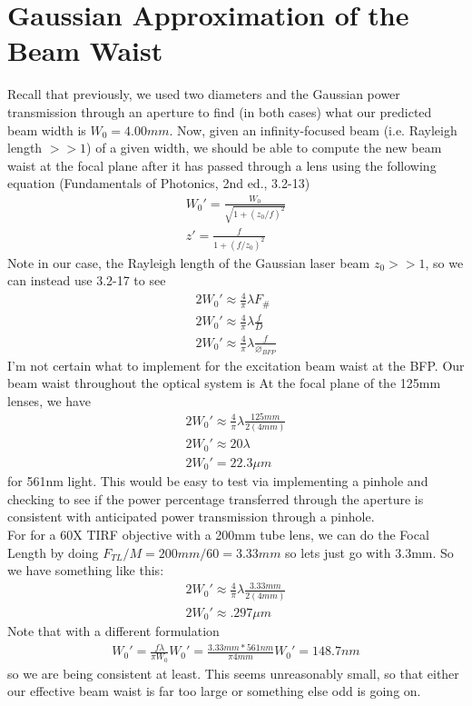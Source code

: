 \section{Gaussian Approximation of the Beam Waist}
Recall that previously, we used two diameters and the Gaussian power transmission through an aperture to find (in both cases) what our predicted beam width is $W_0=4.00mm$. Now, given an infinity-focused beam (i.e. Rayleigh length $>>1$) of a given width, we should be able to compute the new beam waist at the focal plane after it has passed through a lens using the following equation (Fundamentals of Photonics, 2nd ed., 3.2-13)
\begin{gather}
    W_0'= \frac{W_0}{\sqrt{1+(z_0/f)^2}}\\
    z' = \frac{f}{1+(f/z_0)^2}
\end{gather}
Note in our case, the Rayleigh length of the Gaussian laser beam $z_0>>1$, so we can instead use 3.2-17 to see
\begin{gather}
    2W_0' \approx \frac 4 \pi \lambda F_\#\\
    2W_0' \approx \frac 4 \pi \lambda \frac f D\\
    2W_0' \approx \frac 4 \pi \lambda \frac f {\diameter_{BFP}}
\end{gather}
I'm not certain what to implement for the excitation beam waist at the BFP. Our beam waist throughout the optical system is 
At the focal plane of the 125mm lenses, we have
\begin{gather}
    2W_0' \approx \frac 4 \pi \lambda \frac{125mm}{2(4mm)}\\
    2W_0' \approx 20 \lambda\\
    2W_0' = 22.3 \mu m
\end{gather}
for 561nm light. This would be easy to test via implementing a pinhole and checking to see if the power percentage transferred through the aperture is consistent with anticipated power transmission through a pinhole.\\
For for a 60X TIRF objective with a 200mm tube lens, we can do the Focal Length by doing $F_{TL}/M = 200mm/60 = 3.33mm$ so lets just go with 3.3mm. So we have something like this:
\begin{gather}
    2W_0' \approx \frac 4 \pi \lambda \frac{3.33mm}{2(4mm)}\\
    2W_0' \approx .297 \mu m
\end{gather}
Note that with a different formulation
\begin{gather}
    W_0' = \frac{f \lambda }{\pi W_0} 
    W_0' = \frac{3.33mm*561nm}{\pi 4mm}
    W_0' = 148.7 nm
\end{gather}
so we are being consistent at least. This seems unreasonably small, so that either our effective beam waist is far too large or something else odd is going on. \\

